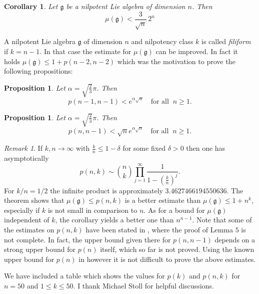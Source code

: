 \documentclass[12pt]{amsart}
\newtheorem{cor}[thm]{Corollary}
\newtheorem{prop}[thm]{Proposition}
\theoremstyle{definition}
\theoremstyle{remark}
\newtheorem{rem}[thm]{Remark}
\newcommand{\Lg}{\mathfrak{g}}
\newcommand{\al}{\alpha}
\newcommand{\de}{\delta}
\newcommand{\ra}{\rightarrow}
\begin{document}
\begin{cor}
Let $\Lg$ be a nilpotent Lie algebra of dimension $n$. Then
$$\mu(\Lg)<\frac{3}{\sqrt{n}}\, 2^n$$
\end{cor} 

A nilpotent Lie algebra $\Lg$ of dimension $n$ and nilpotency class $k$
is called {\it filiform} if $k=n-1$. 
In that case the estimate for $\mu (\Lg)$ can be improved. In fact it holds
$\mu(\Lg)\le 1+p(n-2,n-2)$ which was the motivation to prove the
following propositions:

\begin{prop}\label{pr1}
Let $\al=\sqrt{\frac{2}{3}}\pi$. Then 
$$p(n-1,n-1)<e^{\al \sqrt{n}}\quad \text{for all} \;\; n\ge 1.$$
\end{prop}

\begin{prop}\label{pr2} 
Let $\al=\sqrt{\frac{2}{3}}\pi$. Then 
$$p(n,n-1)<\sqrt{n}e^{\al \sqrt{n}} \quad \text{for all} \;\; n\ge 1.$$ 
\end{prop}


\begin{rem}
If $k,n \ra \infty$ with $\frac{k}{n}\le 1-\de$ for some
fixed $\de>0$ then one has asymptotically
\begin{equation*}
p(n,k)\sim \binom{n}{k}\prod_{j=1}^{\infty} \frac{1}{1-(\frac{k}{n})^j}.
\end{equation*}
For $k/n=1/2$ the infinite product is approximately
$3.4627466194550636$.
The theorem shows that $\mu(\Lg)\le p(n,k)$ is a better estimate than 
$\mu(\Lg)\le 1+n^k$, especially if $k$ is not small in 
comparison to $n$. As for a bound for $\mu(\Lg)$ independent of $k$,
the corollary yields a better one than $n^{n-1}$.
Note that some of the estimates on $p(n,k)$ have been stated in 
\cite{BU5}, where the proof of Lemma $5$ is not complete.
In fact, the upper bound given there for $p(n,n-1)$ depends on a strong
upper bound for $p(n)$ itself, which so far is not proved. Using
the known upper bound for $p(n)$ in \cite{APO} however it is not difficult
to prove the above estimates.
\end{rem}  

We have included a table which
shows the values for $p(k)$ and $p(n,k)$ for
$n=50$ and $1\le k\le 50$. I thank Michael Stoll for helpful discussions.
\end{document}
